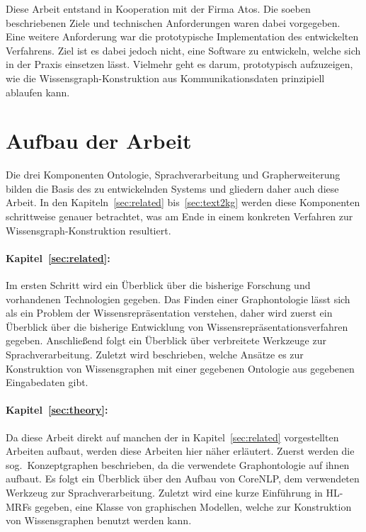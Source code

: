 Diese Arbeit entstand in Kooperation mit der Firma Atos.
Die soeben beschriebenen Ziele und technischen Anforderungen waren dabei vorgegeben.
Eine weitere Anforderung war die prototypische Implementation des entwickelten Verfahrens.
Ziel ist es dabei jedoch nicht, eine Software zu entwickeln, welche sich in der Praxis einsetzen lässt.
Vielmehr geht es darum, prototypisch aufzuzeigen, wie die Wissensgraph-Konstruktion aus Kommunikationsdaten prinzipiell ablaufen kann.

\section{Aufbau der Arbeit}%
\label{sec:intro:structure}

Die drei Komponenten Ontologie, Sprachverarbeitung und Grapherweiterung bilden die Basis des zu entwickelnden Systems und gliedern daher auch diese Arbeit.
In den Kapiteln~\ref{sec:related} bis~\ref{sec:text2kg} werden diese Komponenten schrittweise genauer betrachtet, was am Ende in einem konkreten Verfahren zur Wissensgraph-Konstruktion resultiert.

\paragraph{Kapitel~\ref{sec:related}: }
Im ersten Schritt wird ein Überblick über die bisherige Forschung und vorhandenen Technologien gegeben.
Das Finden einer Graphontologie lässt sich als ein Problem der Wissensrepräsentation verstehen, daher wird zuerst ein Überblick über die bisherige Entwicklung von Wissensrepräsentationsverfahren gegeben.
Anschließend folgt ein Überblick über verbreitete Werkzeuge zur Sprachverarbeitung.
Zuletzt wird beschrieben, welche Ansätze es zur Konstruktion von Wissensgraphen mit einer gegebenen Ontologie aus gegebenen Eingabedaten gibt.

\paragraph{Kapitel~\ref{sec:theory}: }
Da diese Arbeit direkt auf manchen der in Kapitel~\ref{sec:related} vorgestellten Arbeiten aufbaut, werden diese Arbeiten hier näher erläutert.
Zuerst werden die sog.\ Konzeptgraphen beschrieben, da die verwendete Graphontologie auf ihnen aufbaut.
Es folgt ein Überblick über den Aufbau von CoreNLP, dem verwendeten Werkzeug zur Sprachverarbeitung.
Zuletzt wird eine kurze Einführung in HL-MRFs gegeben, eine Klasse von graphischen Modellen, welche zur Konstruktion von Wissensgraphen benutzt werden kann.


